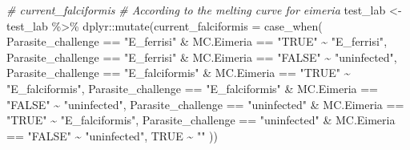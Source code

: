 \documentclass[
]{article}
\newenvironment{Shaded}{\begin{snugshade}}{\end{snugshade}}
\newcommand{\AttributeTok}[1]{\textcolor[rgb]{0.77,0.63,0.00}{#1}}
\newcommand{\CommentTok}[1]{\textcolor[rgb]{0.56,0.35,0.01}{\textit{#1}}}
\newcommand{\ConstantTok}[1]{\textcolor[rgb]{0.00,0.00,0.00}{#1}}
\newcommand{\FunctionTok}[1]{\textcolor[rgb]{0.00,0.00,0.00}{#1}}
\newcommand{\NormalTok}[1]{#1}
\newcommand{\OtherTok}[1]{\textcolor[rgb]{0.56,0.35,0.01}{#1}}
\newcommand{\SpecialCharTok}[1]{\textcolor[rgb]{0.00,0.00,0.00}{#1}}
\newcommand{\StringTok}[1]{\textcolor[rgb]{0.31,0.60,0.02}{#1}}
\begin{document}
\begin{Shaded}
\begin{Highlighting}[]
\CommentTok{\# current\_falciformis}
\CommentTok{\# According to the melting curve for eimeria }
\NormalTok{test\_lab }\OtherTok{\textless{}{-}}\NormalTok{ test\_lab }\SpecialCharTok{\%\textgreater{}\%}
\NormalTok{    dplyr}\SpecialCharTok{::}\FunctionTok{mutate}\NormalTok{(}\AttributeTok{current\_falciformis =} \FunctionTok{case\_when}\NormalTok{(}
\NormalTok{        Parasite\_challenge }\SpecialCharTok{==} \StringTok{"E\_ferrisi"} \SpecialCharTok{\&}\NormalTok{ MC.Eimeria }\SpecialCharTok{==} \StringTok{"TRUE"} \SpecialCharTok{\textasciitilde{}} \StringTok{"E\_ferrisi"}\NormalTok{,}
\NormalTok{        Parasite\_challenge }\SpecialCharTok{==} \StringTok{"E\_ferrisi"} \SpecialCharTok{\&}\NormalTok{ MC.Eimeria }\SpecialCharTok{==} \StringTok{"FALSE"} \SpecialCharTok{\textasciitilde{}} \StringTok{"uninfected"}\NormalTok{,}
\NormalTok{        Parasite\_challenge }\SpecialCharTok{==} \StringTok{"E\_falciformis"} \SpecialCharTok{\&}\NormalTok{ MC.Eimeria }\SpecialCharTok{==} \StringTok{"TRUE"} \SpecialCharTok{\textasciitilde{}} \StringTok{"E\_falciformis"}\NormalTok{,}
\NormalTok{        Parasite\_challenge }\SpecialCharTok{==} \StringTok{"E\_falciformis"} \SpecialCharTok{\&}\NormalTok{ MC.Eimeria }\SpecialCharTok{==} \StringTok{"FALSE"} \SpecialCharTok{\textasciitilde{}} \StringTok{"uninfected"}\NormalTok{,}
\NormalTok{        Parasite\_challenge }\SpecialCharTok{==} \StringTok{"uninfected"} \SpecialCharTok{\&}\NormalTok{ MC.Eimeria }\SpecialCharTok{==} \StringTok{"TRUE"} \SpecialCharTok{\textasciitilde{}} \StringTok{"E\_falciformis"}\NormalTok{,}
\NormalTok{        Parasite\_challenge }\SpecialCharTok{==} \StringTok{"uninfected"} \SpecialCharTok{\&}\NormalTok{ MC.Eimeria }\SpecialCharTok{==} \StringTok{"FALSE"} \SpecialCharTok{\textasciitilde{}} \StringTok{"uninfected"}\NormalTok{,}
        \ConstantTok{TRUE} \SpecialCharTok{\textasciitilde{}} \StringTok{""}
\NormalTok{    ))}


\end{Highlighting}
\end{Shaded}
\end{document}

